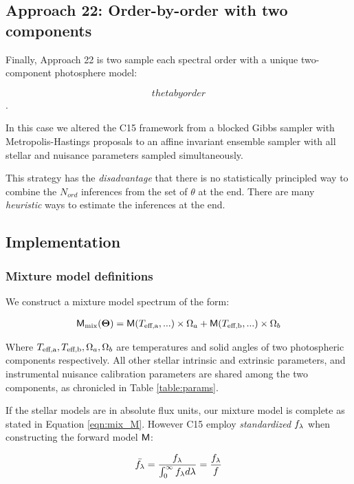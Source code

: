 \documentclass[onecolumn]{emulateapj}%
\newcommand{\iancze}{{\sc C15 }}
\begin{document}
\subsection{Approach 22: Order-by-order with two components}
\label{sec:approach22}

Finally, Approach 22 is two sample each spectral order with a unique two-component photosphere model: 

$$ theta by order$$. 

In this case we altered the \iancze framework from a blocked Gibbs sampler with Metropolis-Hastings proposals to an affine invariant ensemble sampler with all stellar and nuisance parameters sampled simultaneously.  

This strategy has the \emph{disadvantage} that there is no statistically principled way to combine the $N_{ord}$ inferences from the set of $\theta$ at the end.  There are many \emph{heuristic} ways to estimate the inferences at the end.  


\subsection{Implementation}

\subsubsection{Mixture model definitions}

We construct a mixture model spectrum of the form:

\begin{eqnarray} \label{eqn:mix_M}
\mathsf{M}_{\mathrm{mix}}({\bm \Theta}) = \mathsf{M}(T_\textrm{eff,a}, ...) \times \Omega_a + \mathsf{M}(T_\textrm{eff,b}, ...) \times \Omega_b
\end{eqnarray}


Where $T_\textrm{eff,a}, T_\textrm{eff,b}, \Omega_a, \Omega_b$ are temperatures and solid angles of two photospheric components respectively.  All other stellar intrinsic and extrinsic parameters, and instrumental nuisance calibration parameters are shared among the two components, as chronicled in Table \ref{table:params}.

If the stellar models are in absolute flux units, our mixture model is complete as stated in Equation \ref{eqn:mix_M}.  However \iancze employ \emph{standardized} $f_\lambda$ when constructing the forward model $\mathsf{M}$:


\begin{eqnarray} \label{eqn:normalization}
\bar {f_\lambda} = \frac{f_\lambda}{\int_{0}^{\infty} f_\lambda d\lambda} = \frac{f_\lambda}{f}
\end{eqnarray}
\end{document}
